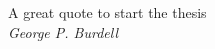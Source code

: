 
\newcommand{\yourQuote}{A great quote to start the thesis}
\newcommand{\yourAuthor}{George P. Burdell}


\begin{titlepage}
\begin{center}

\vspace*{\fill}
\yourQuote\\
\textit{\yourAuthor}
\vspace*{\fill}

\end{center}
\end{titlepage}

